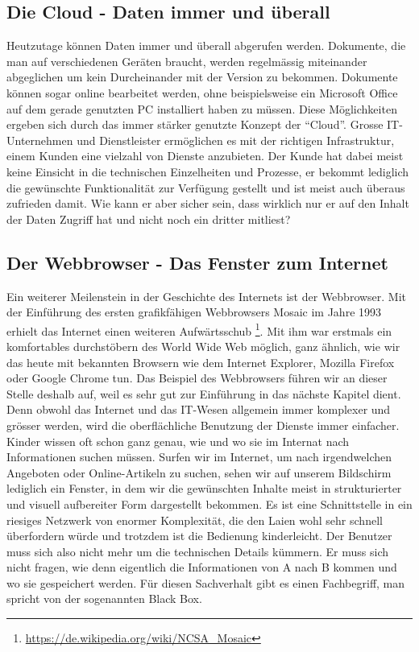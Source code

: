 \subsection{Die Cloud - Daten immer und überall}
Heutzutage können Daten immer und überall abgerufen werden. Dokumente, die man auf verschiedenen Geräten braucht, werden regelmässig miteinander abgeglichen um kein Durcheinander mit der Version zu bekommen. Dokumente können sogar online bearbeitet werden, ohne beispielsweise ein Microsoft Office auf dem gerade genutzten PC installiert haben zu müssen. Diese Möglichkeiten ergeben sich durch das immer stärker genutzte Konzept der ``Cloud''. Grosse IT-Unternehmen und Dienstleister ermöglichen es mit der richtigen Infrastruktur, einem Kunden eine vielzahl von Dienste anzubieten. Der Kunde hat dabei meist keine Einsicht in die technischen Einzelheiten und Prozesse, er bekommt lediglich die gewünschte Funktionalität zur Verfügung gestellt und ist meist auch überaus zufrieden damit. Wie kann er aber sicher sein, dass wirklich nur er auf den Inhalt der Daten Zugriff hat und nicht noch ein dritter mitliest?

\subsection{Der Webbrowser - Das Fenster zum Internet}
Ein weiterer Meilenstein in der Geschichte des Internets ist der Webbrowser. Mit der Einführung des ersten grafikfähigen Webbrowsers Mosaic im Jahre 1993 erhielt das Internet einen weiteren Aufwärtsschub
\footnote{\url{https://de.wikipedia.org/wiki/NCSA_Mosaic}}.
Mit ihm war erstmals ein komfortables durchstöbern des World Wide Web möglich, ganz ähnlich, wie wir das heute mit bekannten Browsern wie dem Internet Explorer, Mozilla Firefox oder Google Chrome tun. Das Beispiel des Webbrowsers führen wir an dieser Stelle deshalb auf, weil es sehr gut zur Einführung in das nächste Kapitel dient.
Denn obwohl das Internet und das IT-Wesen allgemein immer komplexer und grösser werden, wird die oberflächliche Benutzung der Dienste immer einfacher. Kinder wissen oft schon ganz genau, wie und wo sie im Internat nach Informationen suchen müssen. Surfen wir im Internet, um nach irgendwelchen Angeboten oder Online-Artikeln zu suchen, sehen wir auf unserem Bildschirm lediglich ein Fenster, in dem wir die gewünschten Inhalte meist in strukturierter und visuell aufbereiter Form dargestellt bekommen. Es ist eine Schnittstelle in ein riesiges Netzwerk von enormer Komplexität, die den Laien wohl sehr schnell überfordern würde und trotzdem ist die Bedienung kinderleicht. Der Benutzer muss sich also nicht mehr um die technischen Details kümmern. Er muss sich nicht fragen, wie denn eigentlich die Informationen von A nach B kommen und wo sie gespeichert werden. Für diesen Sachverhalt gibt es einen Fachbegriff, man spricht von der sogenannten Black Box.

